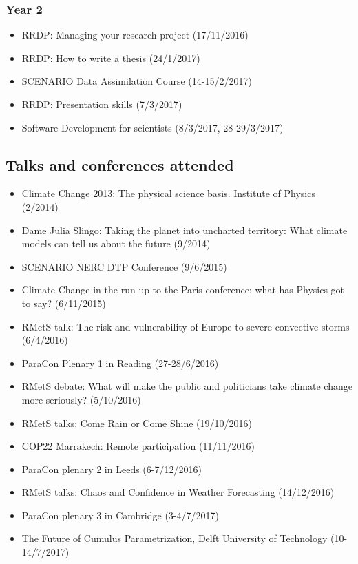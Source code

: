 \documentclass[11pt,a4paper]{article}
\begin{document}
\subsubsection*{Year 2}

\begin{itemize}
  \item RRDP: Managing your research project (17/11/2016)
  \item RRDP: How to write a thesis (24/1/2017)
  \item SCENARIO Data Assimilation Course (14-15/2/2017)
  \item RRDP: Presentation skills (7/3/2017)
  \item Software Development for scientists (8/3/2017, 28-29/3/2017)
\end{itemize}

\subsection*{Talks and conferences attended}

\begin{itemize}
  \item Climate Change 2013: The physical science basis. Institute of Physics (2/2014)
  \item Dame Julia Slingo: Taking the planet into uncharted territory: What climate models can tell us about the future (9/2014)
  \item SCENARIO NERC DTP Conference (9/6/2015)
  \item Climate Change in the run-up to the Paris conference: what has Physics got to say? (6/11/2015)
  \item RMetS talk: The risk and vulnerability of Europe to severe convective storms (6/4/2016)
  \item ParaCon Plenary 1 in Reading (27-28/6/2016)
  \item RMetS debate: What will make the public and politicians take climate change more seriously? (5/10/2016)
  \item RMetS talks: Come Rain or Come Shine (19/10/2016)
  \item COP22 Marrakech: Remote participation (11/11/2016)
  \item ParaCon plenary 2 in Leeds (6-7/12/2016)
  \item RMetS talks: Chaos and Confidence in Weather Forecasting (14/12/2016)
  \item ParaCon plenary 3 in Cambridge (3-4/7/2017)
  \item The Future of Cumulus Parametrization, Delft University of Technology (10-14/7/2017)
\end{itemize}
\end{document}
